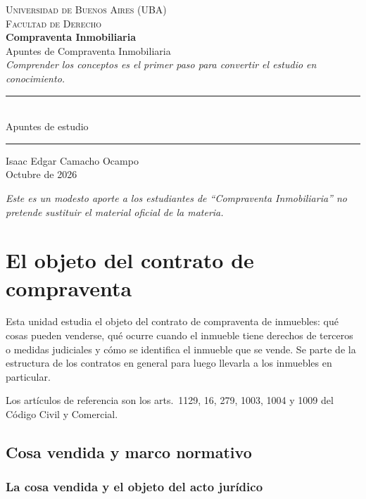 \documentclass[12pt,oneside]{book}
\newcommand{\universidad}{Universidad de Buenos Aires (UBA)}
\newcommand{\facultad}{Facultad de Derecho}
\newcommand{\materia}{Compraventa Inmobiliaria}
\newcommand{\titulo}{Apuntes de Compraventa Inmobiliaria}
\newcommand{\autor}{Isaac Edgar Camacho Ocampo}
\newcommand{\anio}{2026}
\begin{document}
\begin{titlepage}
\thispagestyle{empty}
\begin{center}
\vspace*{1cm}
{\large \textsc{\universidad}}\\[0.2cm]
{\large \textsc{\facultad}}\\[3cm]
{\Huge \textbf{\materia}}\\[1cm]
{\LARGE \titulo}\\[0.8cm]
\textit{Comprender los conceptos es el primer paso para convertir el estudio en conocimiento.}\\[1.2cm]
\rule{0.70\textwidth}{0.5pt}\\[0.5cm]
{\large Apuntes de estudio}\\[0.5cm]
\rule{0.70\textwidth}{0.5pt}
\vfill
{\large \autor}\\[0.3cm]
{\large Octubre de \anio}
\end{center}
\vfill
\begin{flushleft}
\textit{Este es un modesto aporte a los estudiantes de ``Compraventa Inmobiliaria'' no pretende sustituir el material oficial de la materia.}
\end{flushleft}
\end{titlepage}

\tableofcontents

\chapter{El objeto del contrato de compraventa}

Esta unidad estudia el objeto del contrato de compraventa de inmuebles: qué cosas pueden venderse, qué ocurre cuando el inmueble tiene derechos de terceros o medidas judiciales y cómo se identifica el inmueble que se vende. Se parte de la estructura de los contratos en general para luego llevarla a los inmuebles en particular.

Los artículos de referencia son los arts.\ 1129, 16, 279, 1003, 1004 y 1009 del Código Civil y Comercial.

\section{Cosa vendida y marco normativo}

\subsection{La cosa vendida y el objeto del acto jurídico}
\end{document}
